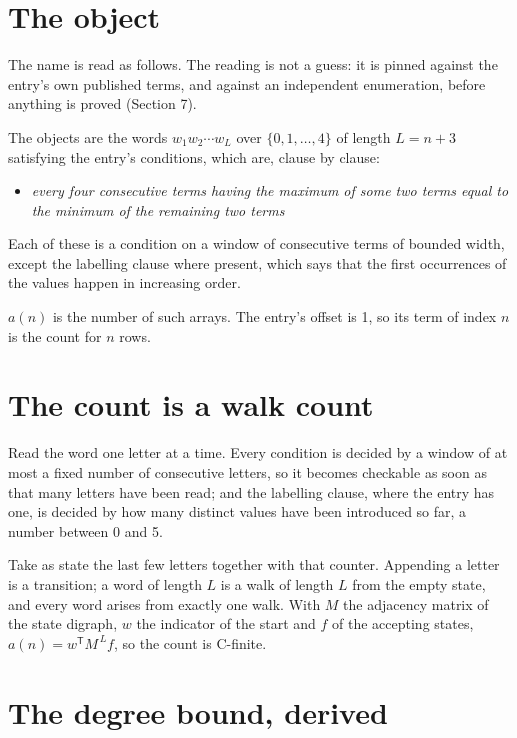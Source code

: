 \documentclass[11pt]{article}
\theoremstyle{definition}
\begin{document}
\section{The object}

The name is read as follows. The reading is not a guess: it is pinned against the entry's own published terms, and against an independent enumeration, before anything is proved (Section 7).

The objects are the words $w_1 w_2 \cdots w_L$ over $\{0,1,\dots,4\}$ of length $L = n + 3$ satisfying the entry's conditions, which are, clause by clause:

\begin{itemize}

\item {\itshape every four consecutive terms having the maximum of some two terms equal to the minimum of the remaining two terms}

\end{itemize}

Each of these is a condition on a window of consecutive terms of bounded width, except the labelling clause where present, which says that the first occurrences of the values happen in increasing order.

$a(n)$ is the number of such arrays. The entry's offset is 1, so its term of index $n$ is the count for $n$ rows.

\section{The count is a walk count}

Read the word one letter at a time. Every condition is decided by a window of at most a fixed number of consecutive letters, so it becomes checkable as soon as that many letters have been read; and the labelling clause, where the entry has one, is decided by how many distinct values have been introduced so far, a number between $0$ and 5.

Take as state the last few letters together with that counter. Appending a letter is a transition; a word of length $L$ is a walk of length $L$ from the empty state, and every word arises from exactly one walk. With $M$ the adjacency matrix of the state digraph, $w$ the indicator of the start and $f$ of the accepting states, $a(n) = w^{\mathsf T}M^{\,L}f$, so the count is C-finite.

\section{The degree bound, derived}
\end{document}
